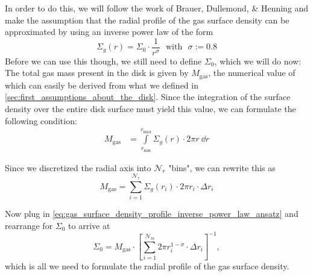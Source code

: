         In order to do this, we will 
        follow the work of Brauer, Dullemond, \& Henning \cite{brauer_dullemond_henning_2007}
        and make the assumption that the radial profile of the gas surface density can be 
        approximated by using an inverse power law of the form
        \begin{equation}
            \label{eq:gas_surface_density_profile_inverse_power_law_ansatz}
            \Sigma_g(r) = \Sigma_0\cdot\frac{1}{r^\sigma}
            \ \ \ \text{with}\ \ \
            \sigma := 0.8
        \end{equation}  %
        Before we can use this though, we still need to define $\Sigma_0$, which we will do now: \\

        The total gas mass present in the disk is given by $M_\text{gas}$, the numerical value of 
        which can easily be derived from what we defined in
        \cref{sec:first_assumptions_about_the_disk}. Since the integration of the surface density 
        over the entire disk surface must yield this value, we can formulate the following 
        condition:
        \begin{align}
            M_\text{gas}
                &= \int\limits_{r_\text{min}}^{r_\text{max}} \Sigma_g(r) \cdot 2\pi r \ \dd r
        \end{align}

        Since we discretized the radial axis into $\mathcal N_r$ "bins", we can rewrite this as
        \begin{equation}
            M_\text{gas} = \sum_{i=1}^{\mathcal N_r} \Sigma_g(r_i) \cdot 2\pi r_i \cdot \Delta r_i
        \end{equation}

        Now plug in \cref{eq:gas_surface_density_profile_inverse_power_law_ansatz} and 
        rearrange for $\Sigma_0$ to arrive at
        \begin{equation}
            \Sigma_0
                = M_\text{gas} \cdot \left[
                    \sum_{i=1}^{\mathcal N_m} 2\pi r_i^{1-\sigma} \cdot \Delta r_i
                \right]^{-1},
        \end{equation}
        which is all we need to formulate the radial profile of the gas surface density.

